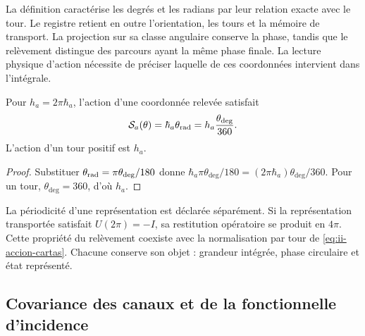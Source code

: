 La définition caractérise les degrés et les radians par leur relation exacte
avec le tour. Le registre retient en outre l’orientation, les tours et la
mémoire de transport. La projection sur sa classe angulaire conserve
la phase, tandis que le relèvement distingue des parcours ayant la même
phase finale. La lecture physique d’action nécessite de préciser laquelle de
ces coordonnées intervient dans l’intégrale.

\begin{proposition}
Pour \(h_a=2\pi\hbar_a\), l'action d'une coordonnée relevée
satisfait
\begin{equation}
 \mathcal S_a(\theta)
 =\hbar_a\theta_{\rm rad}
 =h_a\frac{\theta_{\deg}}{360}.
 \label{eq:ii-accion-cartas}
\end{equation}
L’action d’un tour positif est \(h_a\).
\end{proposition}
\begin{proof}
Substituer \(\theta_{\rm rad}=\pi\theta_{\deg}/180\) donne
\(\hbar_a\pi\theta_{\deg}/180
=(2\pi\hbar_a)\theta_{\deg}/360\). Pour un tour,
\(\theta_{\deg}=360\), d'où \(h_a\).
\end{proof}

La périodicité d'une représentation est déclarée séparément. Si la
représentation transportée satisfait \(U(2\pi)=-I\), sa restitution
opératoire se produit en \(4\pi\). Cette propriété du relèvement
coexiste avec la normalisation par tour de
\eqref{eq:ii-accion-cartas}. Chacune conserve son objet : grandeur
intégrée, phase circulaire et état représenté.

\subsection{Covariance des canaux et de la fonctionnelle d'incidence}

